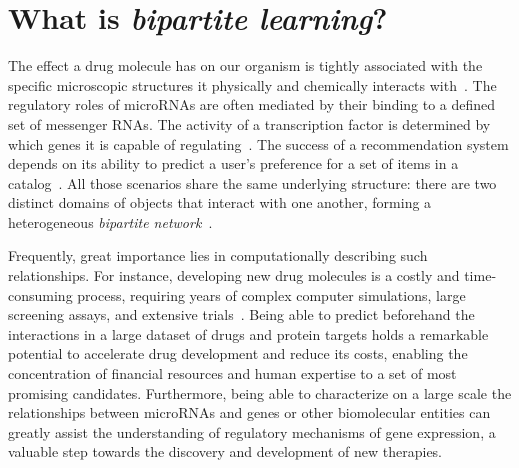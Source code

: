 

\section{What is \emph{bipartite learning}?}
\label{sec:bipartite learning}



The effect a drug molecule has on our organism is tightly associated with the specific microscopic structures it physically and chemically interacts with~\cite{bagherian2020machine,chen2018machine}. The regulatory roles of microRNAs are often mediated by their binding to a defined set of messenger RNAs. The activity of a transcription factor is determined by which genes it is capable of regulating~\cite{faith2007largescale}. The success of a recommendation system depends on its ability to predict a user's preference for a set of items in a catalog~\cite{lu2012recommender}.
%
All those scenarios share the same underlying structure: there are two distinct domains of objects that interact with one another, forming a heterogeneous \emph{bipartite network}~\cite{asratian1998bipartite}.
%


Frequently, great importance lies in computationally describing such relationships. For instance, developing new drug molecules is a costly and time-consuming process,
requiring years of complex computer simulations, large screening assays, and extensive trials~\cite{chen2018machine,bagherian2020machine}.  %
Being able to predict beforehand the interactions in a large dataset of drugs and protein targets holds a remarkable potential to accelerate drug development and reduce its costs, enabling the concentration of financial resources and human expertise to a set of most promising candidates. Furthermore, being able to characterize on a large scale the relationships between microRNAs and genes or other biomolecular entities can greatly assist the understanding of regulatory mechanisms of gene expression, a valuable step towards the discovery and development of new therapies. 

